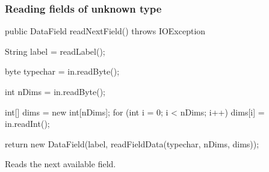 \subsubsection*{Reading fields of unknown type}
\begin{code}

   public DataField readNextField() throws IOException \begin{hide} {

      String label = readLabel();

      byte typechar = in.readByte();

      int nDims = in.readByte();

      int[] dims = new int[nDims];
      for (int i = 0; i < nDims; i++)
         dims[i] = in.readInt();


      return new DataField(label, readFieldData(typechar, nDims, dims));
   }
   \end{hide}
\end{code}
\begin{tabb}
Reads the next available field.
\end{tabb}
\begin{htmlonly}
\end{htmlonly}
